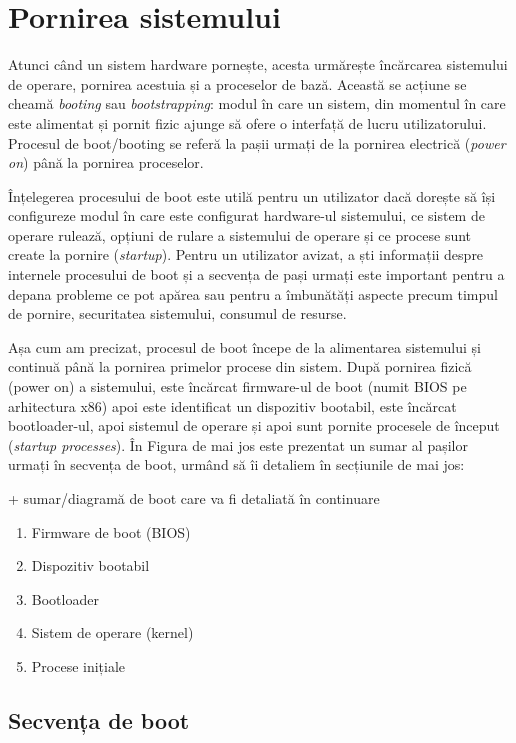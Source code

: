 \chapter{Pornirea sistemului}
\label{chapter:boot}

Atunci când un sistem hardware pornește, acesta urmărește încărcarea sistemului
de operare, pornirea acestuia și a proceselor de bază. Această se acțiune se
cheamă \textit{booting} sau \textit{bootstrapping}: modul în care un sistem, din momentul în care
este alimentat și pornit fizic ajunge să ofere o interfață de lucru
utilizatorului. Procesul de boot/booting se referă la pașii urmați de la
pornirea electrică (\textit{power on}) până la pornirea proceselor.

Înțelegerea procesului de boot este utilă pentru un utilizator dacă dorește să
își configureze modul în care este configurat hardware-ul sistemului, ce sistem
de operare rulează, opțiuni de rulare a sistemului de operare și ce procese sunt
create la pornire (\textit{startup}). Pentru un utilizator avizat, a ști informații
despre internele procesului de boot și a secvența de pași urmați este important
pentru a depana probleme ce pot apărea sau pentru a îmbunătăți aspecte precum
timpul de pornire, securitatea sistemului, consumul de resurse.

Așa cum am precizat, procesul de boot începe de la alimentarea sistemului și
continuă până la pornirea primelor procese din sistem. După pornirea fizică
(power on) a sistemului, este încărcat firmware-ul de boot (numit BIOS pe
arhitectura x86) apoi este identificat un dispozitiv bootabil, este încărcat
bootloader-ul, apoi sistemul de operare și apoi sunt pornite procesele de
început (\textit{startup processes}). În Figura de mai jos este prezentat un sumar al
pașilor urmați în secvența de boot, urmând să îi detaliem în secțiunile de mai
jos:

+ sumar/diagramă de boot care va fi detaliată în continuare

\begin{enumerate}
	\item Firmware de boot (BIOS)
	\item Dispozitiv bootabil
	\item Bootloader
	\item Sistem de operare (kernel)
	\item Procese inițiale
\end{enumerate}

\section{Secvența de boot}
\label{sec:boot-seq}

